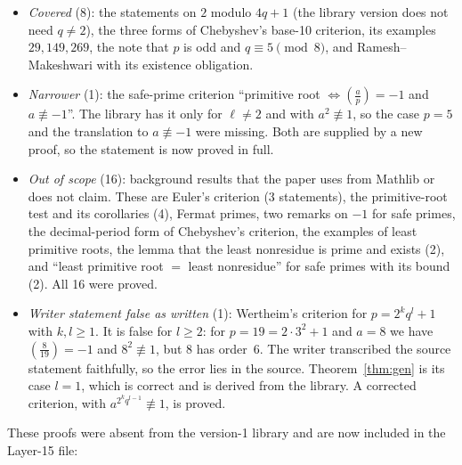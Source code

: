 \documentclass[11pt]{article}
\theoremstyle{remark}
\newcommand{\leg}[2]{\left(\frac{#1}{#2}\right)}
\begin{document}
\begin{itemize}
\item \emph{Covered} (8): the statements on $2$ modulo $4q+1$ (the library version does not need
$q\neq2$), the three forms of Chebyshev's base-10 criterion, its examples $29,149,269$, the
note that $p$ is odd and $q\equiv5\pmod8$, and Ramesh--Makeshwari with its existence obligation.
\item \emph{Narrower} (1): the safe-prime criterion ``primitive root $\iff\leg{a}{p}=-1$ and
$a\not\equiv-1$''. The library has it only for $\ell\neq2$ and with $a^2\not\equiv1$, so the case
$p=5$ and the translation to $a\not\equiv-1$ were missing. Both are supplied by a new proof, so the
statement is now proved in full.
\item \emph{Out of scope} (16): background results that the paper uses from Mathlib or does not claim.
These are Euler's criterion (3 statements), the primitive-root test and its corollaries (4), Fermat
primes, two remarks on $-1$ for safe primes, the decimal-period form of Chebyshev's criterion, the
examples of least primitive roots, the lemma that the least nonresidue is prime and exists (2), and
``least primitive root $=$ least nonresidue'' for safe primes with its bound (2). All 16 were proved.
\item \emph{Writer statement false as written} (1): Wertheim's criterion for $p=2^k q^l+1$ with
$k,l\geq1$. It is false for $l\geq2$: for $p=19=2\cdot3^2+1$ and $a=8$ we have $\leg{8}{19}=-1$ and
$8^2\not\equiv1$, but $8$ has order~$6$. The writer transcribed the source statement faithfully, so
the error lies in the source. Theorem~\ref{thm:gen} is its case $l=1$, which is correct and is
derived from the library. A corrected criterion, with $a^{2^kq^{l-1}}\not\equiv1$, is proved.
\end{itemize}
These proofs were absent from the version-1 library and are now included in the Layer-15 file:
\end{document}
